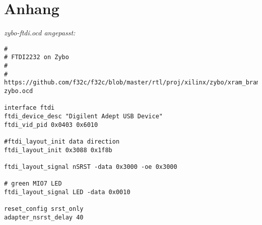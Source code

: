 \chapter{Anhang}

\label{anhang:schemaZybo}






\label{anhang:zybo-ftdi.cfg}
\textit{zybo-ftdi.ocd angepasst:}
\begin{lstlisting}
#
# FTDI2232 on Zybo
#
#  https://github.com/f32c/f32c/blob/master/rtl/proj/xilinx/zybo/xram_bram_hdmi_ise/ftdi-zybo.ocd 

interface ftdi
ftdi_device_desc "Digilent Adept USB Device"
ftdi_vid_pid 0x0403 0x6010

#ftdi_layout_init data direction
ftdi_layout_init 0x3088 0x1f8b

ftdi_layout_signal nSRST -data 0x3000 -oe 0x3000

# green MIO7 LED
ftdi_layout_signal LED -data 0x0010

reset_config srst_only
adapter_nsrst_delay 40
\end{lstlisting}

\label{anhang:zynq_7000.cfg}
